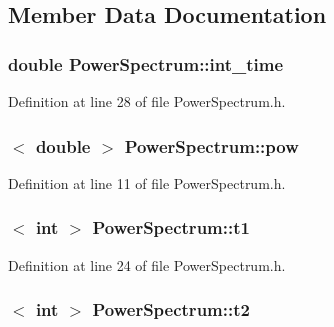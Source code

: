 \subsection{Member Data Documentation}
\hypertarget{classPowerSpectrum_a7d07ae6e17c08448bc5ae8a79fc36a95}{
\subsubsection[{int\_\-time}]{\setlength{\rightskip}{0pt plus 5cm}double {\bf PowerSpectrum::int\_\-time}}}
\label{classPowerSpectrum_a7d07ae6e17c08448bc5ae8a79fc36a95}


Definition at line 28 of file PowerSpectrum.h.

\hypertarget{classPowerSpectrum_a20298a01053cfb3aa197d4bc57526bff}{
\subsubsection[{pow}]{$<$ double $>$ {\bf PowerSpectrum::pow}}}
\label{classPowerSpectrum_a20298a01053cfb3aa197d4bc57526bff}


Definition at line 11 of file PowerSpectrum.h.

\hypertarget{classPowerSpectrum_a63136c308d576020a0611fef55e7165b}{
\subsubsection[{t1}]{$<$ int $>$ {\bf PowerSpectrum::t1}}}
\label{classPowerSpectrum_a63136c308d576020a0611fef55e7165b}


Definition at line 24 of file PowerSpectrum.h.

\hypertarget{classPowerSpectrum_a449e5f435037ff6354d2decaa1345f81}{
\subsubsection[{t2}]{$<$ int $>$ {\bf PowerSpectrum::t2}}}
\label{classPowerSpectrum_a449e5f435037ff6354d2decaa1345f81}



